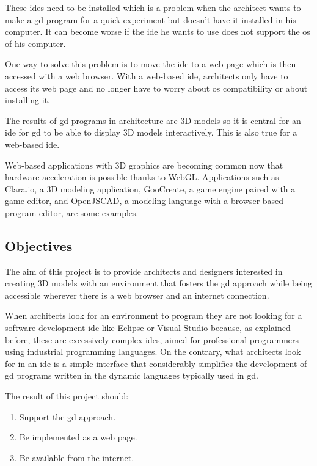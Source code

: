 \documentclass{./llncs2e/llncs}
\begin{document}
	These \acp{ide} need to be installed which is a problem when the architect wants to make a \ac{gd} program for a quick experiment but doesn't have it installed in his computer.
	It can become worse if the \ac{ide} he wants to use does not support the \ac{os} of his computer.

	One way to solve this problem is to move the \ac{ide} to a web page which is then accessed with a web browser.
	With a web-based \ac{ide}, architects only have to access its web page and no longer have to worry about \ac{os} compatibility or about installing it.

	The results of \ac{gd} programs in architecture are 3D models so it is central for an \ac{ide} for \ac{gd} to be able to display 3D models interactively.
	This is also true for a web-based \ac{ide}.
	
	Web-based applications with 3D graphics are becoming common now that hardware acceleration is possible thanks to WebGL\cite{marrin2011webgl}.
	Applications such as Clara.io\cite{houston2013clara}, a 3D modeling application, GooCreate\cite{goocreate2015site}, a game engine paired with a game editor, and OpenJSCAD\cite{openjscad2015site}, a modeling language with a browser based program editor, are some examples.
	
	
\subsection{Objectives}
	The aim of this project is to provide architects and designers interested in creating 3D models with an environment that fosters the \acl{gd} approach while being accessible wherever there is a web browser and an internet connection.

	When architects look for an environment to program they are not looking for a software development \ac{ide} like Eclipse or Visual Studio because, as explained before, these are excessively complex \acp{ide}, aimed for professional programmers using industrial programming languages.
	On the contrary, what architects look for in an \ac{ide} is a simple interface that considerably simplifies the development of \ac{gd} programs written in the dynamic languages typically used in \ac{gd}. 

	The result of this project should:
	\begin{enumerate}
		\item Support the \acl{gd} approach.
		\item Be implemented as a web page.
		\item Be available from the internet.
	\end{enumerate}
	
\end{document}
